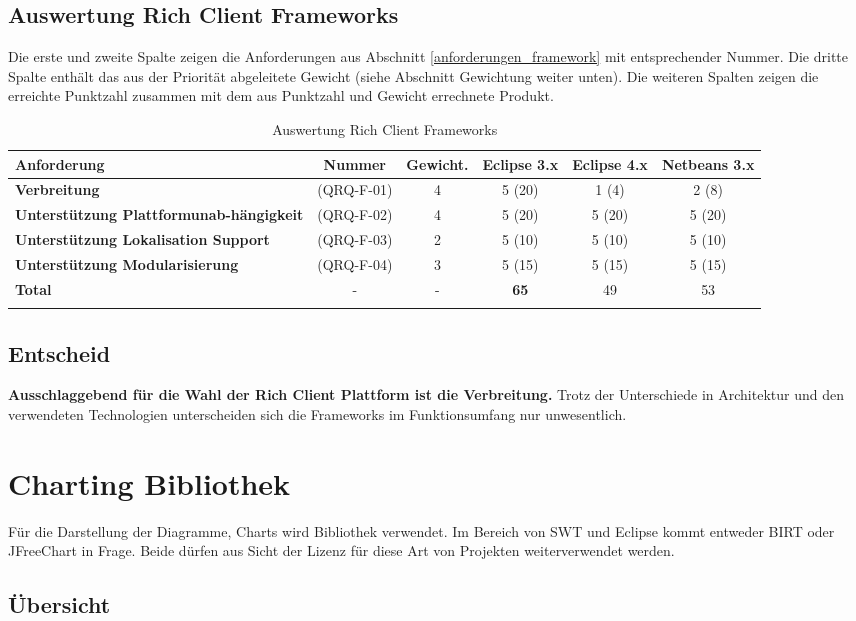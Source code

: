 \subsection{Auswertung Rich Client Frameworks}
Die erste und zweite Spalte zeigen die Anforderungen aus Abschnitt \ref{anforderungen_framework} mit entsprechender Nummer. Die dritte Spalte enthält das aus der Priorität abgeleitete Gewicht (siehe Abschnitt Gewichtung weiter unten). Die weiteren Spalten zeigen die erreichte Punktzahl zusammen mit dem aus Punktzahl und Gewicht errechnete Produkt.
\begin{longtable}{|p{3cm}|c|c|c|c|c|}\hline
 \textbf{Anforderung} & \textbf{Nummer} &  \textbf{Gewicht.} & \textbf{Eclipse 3.x} & \textbf{Eclipse 4.x} &  \textbf{Netbeans 3.x}\\\hline
   \textbf{Verbreitung} & (QRQ-F-01) & 4 & 5 (20) & 1 (4) & 2 (8)\\\hline
   \textbf{Unterstützung Plattformunab-hängigkeit} & (QRQ-F-02) & 4 & 5 (20) & 5 (20) & 5 (20)\\\hline
   \textbf{Unterstützung Lokalisation Support} & (QRQ-F-03) & 2 & 5 (10) & 5 (10) & 5 (10) \\\hline
   \textbf{Unterstützung Modularisierung} & (QRQ-F-04) & 3 & 5 (15) & 5 (15) & 5 (15) \\\hline
   \textbf{Total} & - & - & \textbf{65} & 49 & 53\\\hline
    \caption{Auswertung Rich Client Frameworks}
\end{longtable}

\subsection{Entscheid}\label{rcp_entscheid}
\textbf{Ausschlaggebend für die Wahl der Rich Client Plattform ist die Verbreitung.} Trotz der Unterschiede in Architektur und den verwendeten Technologien unterscheiden sich die Frameworks im Funktionsumfang nur unwesentlich.


\section{Charting Bibliothek}
Für die Darstellung der Diagramme, Charts wird Bibliothek verwendet. Im Bereich von SWT und Eclipse kommt entweder BIRT oder JFreeChart in Frage. Beide dürfen aus Sicht der Lizenz für diese Art von Projekten weiterverwendet werden.

\subsection{Übersicht}
